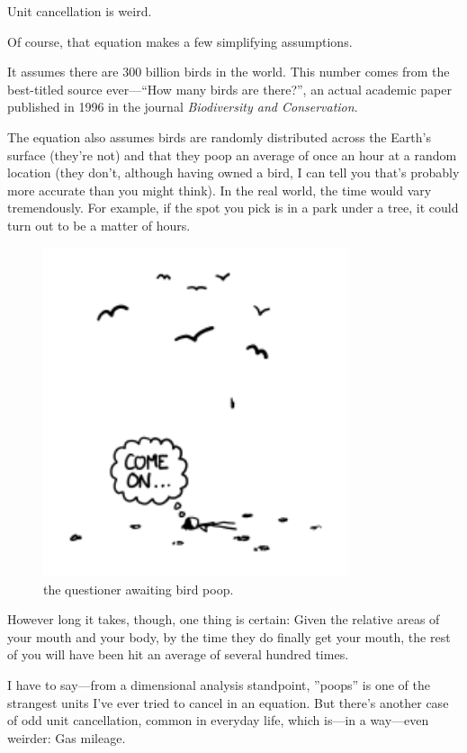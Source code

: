 {Unit cancellation is weird.}

{Of course, that equation makes a few simplifying assumptions.}

{It assumes there are 300 billion birds in the world. This number comes from the best-titled source ever—“How many birds are there?”, an actual academic paper published in 1996 in the journal \emph{Biodiversity and Conservation}.}

{The equation also assumes birds are randomly distributed across the Earth’s surface (they’re not) and that they poop an average of once an hour at a random location (they don't, although having owned a bird, I can tell you that’s probably more accurate than you might think). In the real world, the time would vary tremendously. For example, if the spot you pick is in a park under a tree, it could turn out to be a matter of hours.}

\begin{figure}[!htbp]
\centering
\includegraphics[scale=0.5, max width=0.8\textwidth]{imgs/a/11/droppings_setup.png}
\caption{the questioner awaiting bird poop.}
\end{figure}

{However long it takes, though, one thing is certain: Given the relative areas of your mouth and your body, by the time they do finally get your mouth, the rest of you will have been hit an average of several hundred times.}

{I have to say—from a dimensional analysis standpoint, ”poops” is one of the strangest units I’ve ever tried to cancel in an equation. But there’s another case of odd unit cancellation, common in everyday life, which is—in a way—even weirder: Gas mileage.}


